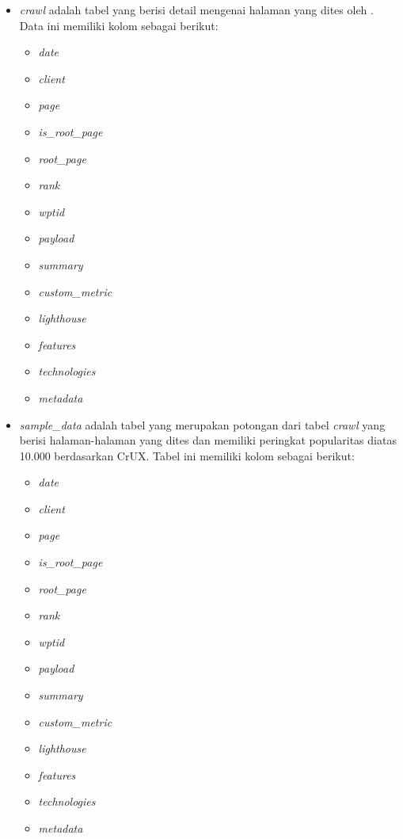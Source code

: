 \begin{itemize}
    \item \textit{crawl} adalah tabel yang berisi detail mengenai halaman yang dites oleh \http. Data ini memiliki kolom sebagai berikut:
    \begin{itemize}
        \item \textit{date}
        \item \textit{client}
        \item \textit{page}
        \item \textit{is\_root\_page}
        \item \textit{root\_page}
        \item \textit{rank}
        \item \textit{wptid}
        \item \textit{payload}
        \item \textit{summary}
        \item \textit{custom\_metric}
        \item \textit{lighthouse}
        \item \textit{features}
        \item \textit{technologies}
        \item \textit{metadata}
    \end{itemize}
    
    \item \textit{sample\_data} adalah tabel yang merupakan potongan dari tabel \textit{crawl} yang berisi halaman-halaman yang dites dan memiliki peringkat popularitas diatas 10.000 berdasarkan CrUX. Tabel ini memiliki kolom sebagai berikut:
    \begin{itemize}
        \item \textit{date}
        \item \textit{client}
        \item \textit{page}
        \item \textit{is\_root\_page}
        \item \textit{root\_page}
        \item \textit{rank}
        \item \textit{wptid}
        \item \textit{payload}
        \item \textit{summary}
        \item \textit{custom\_metric}
        \item \textit{lighthouse}
        \item \textit{features}
        \item \textit{technologies}
        \item \textit{metadata}
    \end{itemize}


\end{itemize}

